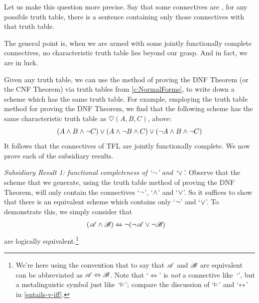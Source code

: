 Let us make this question more precise. Say that some connectives are  \emph{\ifeff}, for any possible truth table, there is a sentence containing only those connectives with that truth table.


The general point is, when we are armed with some jointly functionally complete connectives, no characteristic truth table lies beyond our grasp. And in fact, we are in luck.

Given any truth table, we can use the method of proving the DNF Theorem (or the CNF Theorem) via truth tables from \cref{c:NormalForms}, to write down a scheme which has the same truth table. For example, employing the truth table method for proving the DNF Theorem, we find that the following scheme has the same characteristic truth table as $\heartsuit(A,B,C)$, above:
		$$(A \wedge B \wedge \neg C) \vee (A \wedge \neg B \wedge C) \vee (\neg A \wedge B \wedge \neg C)$$			
It follows that the connectives of TFL are jointly functionally complete. We now prove each of the subsidiary results.
	
\emph{Subsidiary Result 1: functional completeness of `$\neg$' and `$\vee$'.} Observe that the scheme that we generate, using the truth table method of proving the DNF Theorem, will only contain the connectives `$\neg$', `$\wedge$' and `$\vee$'. So it suffices to show that there is an equivalent scheme which contains only `$\neg$' and `$\vee$'. To demonstrate this, we simply consider that
		\begin{align*}
		(\mathscr{A} \wedge \mathscr{B}) & \Leftrightarrow \neg(\neg \mathscr{A} \vee\neg \mathscr{B})
		\end{align*}
		are logically equivalent.\footnote{We're here using the convention
		that to say that $\mathscr{A}$ and $\mathscr{B}$ are equivalent can be
		abbreviated as $\mathscr{A} \Leftrightarrow \mathscr{B}$. Note that
		`$\Leftrightarrow$' is \emph{not} a connective like~`\eiff', but a
		metalinguistic symbol just like~`$\vDash$'; compare the discussion
		of `$\vDash$' and `$\leftrightarrow$' in \cref{entails-v-iff}.}

